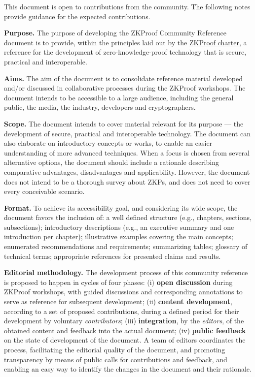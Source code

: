 \label{sec:prelim:open-to-contributions}

	This document is open to contributions from the community. 
	The following notes provide guidance for the expected contributions.


\textbf{Purpose.}
	The purpose of developing the ZKProof Community Reference document is to provide, 
within the principles laid out by the \hyperref[sec:prelim:charter]{ZKProof charter}, 
a reference for the development of zero-knowledge-proof technology that is secure, practical and interoperable.


\textbf{Aims.}
	The aim of the document is to consolidate reference material developed and/or discussed in collaborative processes during the ZKProof workshops. 
	The document intends to be accessible to a large audience, including the general public, the media, the industry, developers and cryptographers.


\textbf{Scope.}
	The document intends to cover material relevant for its purpose --- the development of secure, practical and interoperable technology.
	The document can also elaborate on introductory concepts or works, to enable an easier understanding of more advanced techniques. 
	When a focus is chosen from several alternative options, the document should include a rationale describing comparative advantages, disadvantages and applicability. 
	However, the document does not intend to be a thorough survey about ZKPs, and does not need to cover every conceivable scenario.


\textbf{Format.}
	To achieve its accessibility goal, and considering its wide scope, the document favors the inclusion of: 
	a well defined structure (e.g., chapters, sections, subsections);
	introductory descriptions (e.g., an executive summary and one introduction per chapter); 
	illustrative examples covering the main concepts; 
	enumerated recommendations and requirements; 
	summarizing tables; 
	glossary of technical terms; 
	appropriate references for presented claims and results.


\textbf{Editorial methodology.}
	The development process of this community reference is proposed to happen in cycles of four phases:
	(i) \textbf{open discussion} during ZKProof workshops, with guided discussions and corresponding annotations to serve as reference for subsequent development;
	(ii) \textbf{content development}, according to a set of proposed contributions, during a defined period for their development by voluntary \emph{contributors};
	(iii) \textbf{integration}, by the \emph{editors}, of the obtained content and feedback into the actual document; 
	(iv) \textbf{public feedback} on the state of development of the document.
	A team of editors coordinates the process, facilitating the editorial quality of the document,
and promoting transparency by means of public calls for contributions and feedback, 
and enabling an easy way to identify the changes in the document and their rationale.

